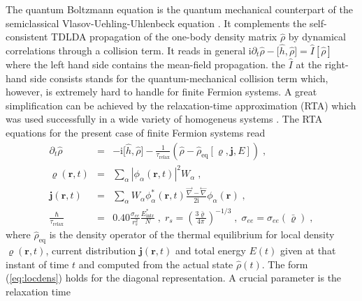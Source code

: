 \documentclass[final,1p]{elsarticle}
\begin{document}
The quantum Boltzmann equation is the quantum mechanical
counterpart of the
semiclassical Vlasov-Uehling-Uhlenbeck equation \cite{Ber88,Abe96}.
It complements the self-consistent TDLDA propagation 
of the one-body density matrix $\hat{\rho}$ by
dynamical correlations through a collision term. It reads in
general \cite{Rei85f,Goe86a}
$\mathrm{i}\partial_t\hat{\rho}
  -
  \big[\hat{h},\hat{\rho}\big]
  =
  \hat{I}[\hat{\rho}]
$
where the left hand side contains the mean-field propagation. the
$\hat{I}$ at the right-hand side consists stands for the
quantum-mechanical collision term which, however, is extremely hard to
handle for finite Fermion systems. A great simplification can be
achieved by the relaxation-time approximation (RTA) which was used
successfully in a wide variety of homogeneus systems
\cite{Pin66,Ash76}. The RTA equations for the present case of finite
Fermion systems read \cite{Rei15a}
\begin{subequations}
\label{eq:EoMbasic}
\begin{eqnarray}
  \partial_t\hat{\rho}
  &=&
  -\mathrm{i}\big[\hat{h},\hat{\rho}\big]
  -
  \frac{1}{\tau_\mathrm{relax}}
  \left(\hat{\rho}-\hat{\rho}_\mathrm{eq}[\varrho,\mathbf{j},E]\right)
  \;,
\label{eq:EoMbasicrho}
\\
  \varrho(\mathbf{r},t)
  &=&
  \sum_\alpha \left|\phi_\alpha(\mathbf{r},t)\right|^2 W_\alpha
  \;,
\\
  \mathbf{j}(\mathbf{r},t)
  &=&
  \sum_\alpha W_\alpha\phi_\alpha^*(\mathbf{r},t)
     \frac{\stackrel{\rightarrow}{\nabla}-\stackrel{\leftarrow}{\nabla}}
          {2\mathrm{i}}
     \phi_\alpha(\mathbf{r})
  \;,
\label{eq:locdens}\\
  \frac{\hbar}{\tau_\mathrm{relax}}
  &=&
  {0.40}\frac{\sigma_{ee}}{r_s^2}\frac{{E}^*_\mathrm{intr}}{N}
  \;,\;
  r_s=\left(\frac{3\bar{\varrho}}{4\pi}\right)^{-1/3}
  \;,\;
  \sigma_{ee}=\sigma_{ee}(\bar{\varrho})
  \;,
\label{eq:relaxtime}
\end{eqnarray}
\end{subequations}
where $\hat{\rho}_\mathrm{eq}$ is the density operator of the thermal
equilibrium for local density $\varrho(\mathbf{r},t)$, current
distribution $\mathbf{j}(\mathbf{r},t)$ and total energy $E(t)$ given
at that instant of time $t$ and computed from the actual state
$\hat{\rho}(t)$.  The form (\ref{eq:locdens}) holds for the diagonal
representation.  
A crucial parameter is the relaxation time
\end{document}
